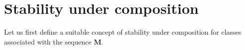 \documentclass[11pt,a4paper]{article}
\theoremstyle{plain}
\theoremstyle{definition}
\newtheorem{remark}[proposition]{Remark}
\newcommand{\M}{\mathbf{M}}
\let\on=\operatorname
\begin{document}





\section{Stability under composition}\label{sect.StabilityCompos}

Let us first define a suitable concept of stability under composition for classes associated with the sequence $\M$.
\end{document}
